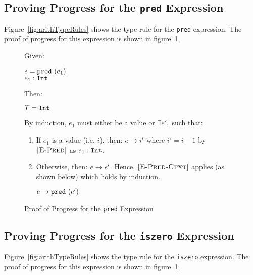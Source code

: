 \documentclass{report}
\newcommand{\rel}[1]{ \mbox{\sc [#1]} }
\begin{document}
\subsection{Proving Progress for the \texttt{pred} Expression}

Figure~\ref{fig:arithTypeRules} shows the type rule for the \texttt{pred} expression.  The proof of progress for this expression is shown in figure~\ref{fig:predProofProgress}.

\begin{figure}[ht!]
Given:
\begin{center}
  $e = \mbox{\tt pred}~(e_1)$ \\
  ${e_1} : {\mbox{\tt Int}}$
\end{center}
Then:~\\
\begin{center}
   $T = \mbox{\tt Int}$
\end{center}

By induction, $e_1$ must either be a value or $\exists e'_1$ such that:~\\

	\begin{enumerate}
    \item If $e_1$ is a value (i.e. $i$), then: ${e} \rightarrow {i'}$ where $i' = i - 1$ by $\rel{E-Pred}$ as ${e_1} : {\mbox{\tt Int}}$.
      
    \item Otherwise, then: ${e} \rightarrow {e'}$.  Hence, $\rel{E-Pred-Ctxt}$ applies (as shown below) which holds by induction.
    
    \begin{center}
      ${e} \rightarrow {\mbox{\tt pred}~(e')}$
    \end{center}
	
	\end{enumerate}
	
  \caption{Proof of Progress for the \texttt{pred} Expression}\label{fig:predProofProgress}
\end{figure}

\subsection{Proving Progress for the \texttt{iszero} Expression}

Figure~\ref{fig:arithTypeRules} shows the type rule for the \texttt{iszero} expression.  The proof of progress for this expression is shown in figure~\ref{fig:predProofProgress}.
\end{document}
